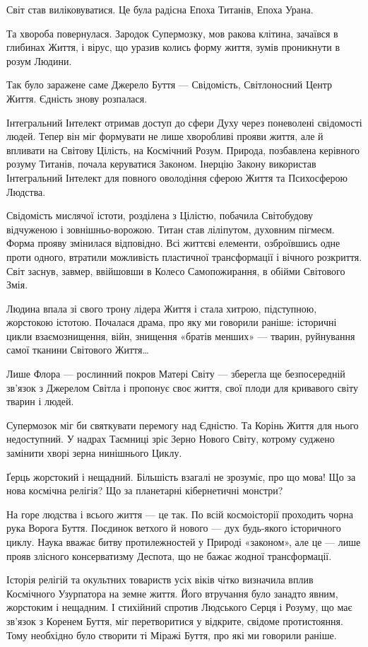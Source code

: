 Світ став виліковуватися. Це була радісна Епоха Титанів, Епоха Урана.

Та хвороба повернулася. Зародок Супермозку, мов ракова клітина, зачаївся в
глибинах Життя, і вірус, що уразив колись форму життя, зумів проникнути в розум
Людини.

Так було заражене саме Джерело Буття — Свідомість, Світлоносний Центр Життя.
Єдність знову розпалася.

Інтегральний Інтелект отримав доступ до сфери Духу через поневолені свідомості
людей. Тепер він міг формувати не лише хворобливі прояви життя, але й впливати
на Світову Цілість, на Космічний Розум. Природа, позбавлена керівного розуму
Титанів, почала керуватися Законом. Інерцію Закону використав Інтегральний
Інтелект для повного оволодіння сферою Життя та Психосферою Людства.

Свідомість мислячої істоти, розділена з Цілістю, побачила Світобудову
відчуженою і зовнішньо-ворожою. Титан став ліліпутом, духовним пігмеєм. Форма
прояву змінилася відповідно. Всі життєві елементи, озброївшись одне проти
одного, втратили можливість пластичної трансформації і вічного розкриття. Світ
заснув, завмер, ввійшовши в Колесо Самопожирання, в обійми Світового Змія.

Людина впала зі свого трону лідера Життя і стала хитрою, підступною, жорстокою
істотою. Почалася драма, про яку ми говорили раніше: історичні цикли
взаємознищення, війн, знищення «братів менших» — тварин, руйнування самої
тканини Світового Життя…

Лише Флора — рослинний покров Матері Світу — зберегла ще безпосередній зв’язок
з Джерелом Світла і пропонує своє життя, свої плоди для кривавого світу тварин
і людей.

Супермозок міг би святкувати перемогу над Єдністю. Та Корінь Життя для нього
недоступний. У надрах Таємниці зріє Зерно Нового Світу, котрому суджено
замінити хворі зерна нинішнього Циклу.

Ґерць жорстокий і нещадний. Більшість взагалі не зрозуміє, про що мова! Що за
нова космічна релігія? Що за планетарні кібернетичні монстри?

На горе людства і всього життя — це так. По всій космоісторії проходить чорна
рука Ворога Буття. Поєдинок ветхого й нового — дух будь-якого історичного
циклу. Наука вважає битву протилежностей у Природі «законом», але це — лише
прояв злісного консерватизму Деспота, що не бажає жодної трансформації.

Історія релігій та окультних товариств усіх віків чітко визначила вплив
Космічного Узурпатора на земне життя. Його втручання було занадто явним,
жорстоким і нещадним. І стихійний спротив Людського Серця і Розуму, що має
зв’язок з Коренем Буття, міг перетворитися у відкрите, свідоме протистояння.
Тому необхідно було створити ті Міражі Буття, про які ми говорили раніше.

